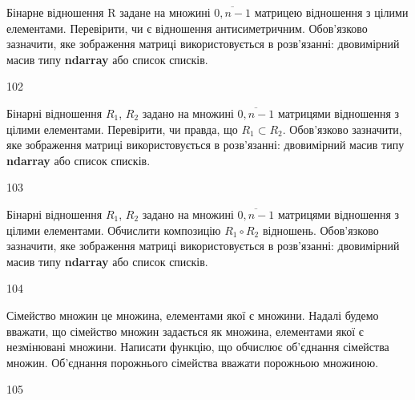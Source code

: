 Бінарне відношення R задане на множині $\overline{0,n-1}$ матрицею відношення з цілими елементами.  Перевірити, чи є відношення антисиметричним. Обов'язково зазначити, яке зображення матриці використовується в розв'язанні: двовимірний масив типу \textbf{ndarray} або список списків.
\\\par
102 














Бінарні відношення $R_1$, $R_2$ задано на множині $\overline{0,n-1}$ матрицями відношення з цілими елементами. Перевірити, чи правда, що $R_1\subset R_2$. Обов'язково зазначити, яке зображення матриці використовується в розв'язанні: двовимірний масив типу \textbf{ndarray} або список списків.
\\\par
103 














Бінарні відношення $R_1$, $R_2$ задано на множині $\overline{0,n-1}$ матрицями відношення з цілими елементами. Обчислити композицію $R_1\circ R_2$ відношень. Обов'язково зазначити, яке зображення матриці використовується в розв'язанні: двовимірний масив типу \textbf{ndarray} або список списків.
\\\par
104 














Сімейство множин це множина, елементами якої є множини. Надалі будемо вважати, що сімейство множин задається як множина, елементами якої є незмінювані множини. Написати функцію, що обчислює об'єднання сімейства множин. Об'єднання порожнього сімейства вважати порожньою множиною.
\\\par
105 














